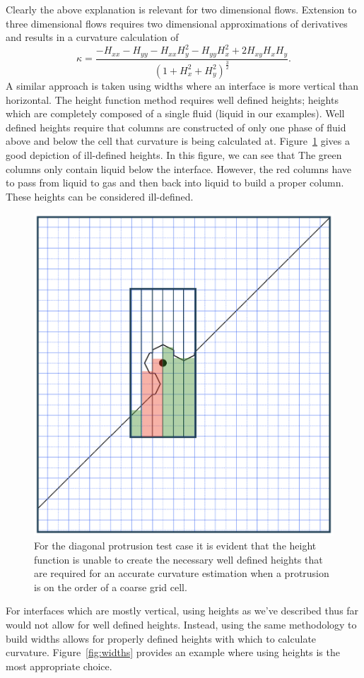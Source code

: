 Clearly the above explanation is relevant for two dimensional flows. Extension to three dimensional flows requires two dimensional approximations of derivatives and results in a curvature calculation of 
\begin{equation}
\kappa = \frac{-H_{xx}-H_{yy}-H_{xx}H_y^2-H_{yy}H_x^2+2H_{xy}H_xH_y}{(1+H_{x}^{2}+H_{y}^{2})^{\frac{3}{2}}}.
\label{eqn:kap3D}
\end{equation}
A similar approach is taken using widths where an interface is more vertical than horizontal. The height function method requires well defined heights; heights which are completely composed of a single fluid (liquid in our examples). Well defined heights require that columns are constructed of only one phase of fluid above and below the cell that curvature is being calculated at. Figure~\ref{fig:probhts} gives a good depiction of ill-defined heights. In this figure, we can see that The green columns only contain liquid below the interface. However, the red columns have to pass from liquid to gas and then back into liquid to build a proper column. These heights can be considered ill-defined. 
\begin{figure}
	\centering
	\includegraphics[width=0.5\linewidth]{figs/probhts.png}
	\caption{For the diagonal protrusion test case it is evident that the height function is unable to create the necessary well defined heights that are required for an accurate curvature estimation when a protrusion is on the order of a coarse grid cell.}
	\label{fig:probhts}
\end{figure}
 For interfaces which are mostly vertical, using heights as we've described thus far would not allow for well defined heights. Instead, using the same methodology to build widths allows for properly defined heights with which to calculate curvature. Figure~\ref{fig:widths} provides an example where using heights is the most appropriate choice.
